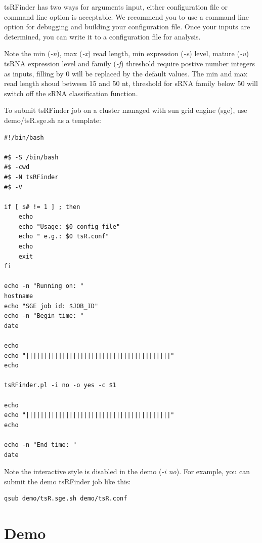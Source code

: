 \documentclass[11pt, a4paper]{article}
\begin{document}
tsRFinder has two ways for arguments input, either configuration file or command line option is acceptable. We recommend you to use a command line option for debugging and building your configuration file. Once your inputs are determined, you can write it to a configuration file for analysis.

Note the min (\emph{-n}), max (\emph{-x}) read length, min expression (\emph{-e}) level, mature (\emph{-u}) tsRNA expression level and family (\emph{-f}) threshold require postive number integers as inputs, filling by 0 will be replaced by the default values. The min and max read length shoud between 15 and 50 nt, threshold for sRNA family below 50 will switch off the sRNA classification function.

To submit tsRFinder job on a cluster managed with sun grid engine (sge), use demo/tsR.sge.sh as a template:

{\scriptsize \begin{tcolorbox}[colback=blue!5!white,colframe=pink!75!black,title=demo/tsR.sge.sh]
\begin{verbatim}
#!/bin/bash

#$ -S /bin/bash
#$ -cwd
#$ -N tsRFinder
#$ -V

if [ $# != 1 ] ; then
	echo
	echo "Usage: $0 config_file"
	echo " e.g.: $0 tsR.conf"
	echo
	exit
fi

echo -n "Running on: "
hostname
echo "SGE job id: $JOB_ID"
echo -n "Begin time: "
date

echo
echo "||||||||||||||||||||||||||||||||||||||||"
echo

tsRFinder.pl -i no -o yes -c $1

echo
echo "||||||||||||||||||||||||||||||||||||||||"
echo

echo -n "End time: "
date
\end{verbatim}
\end{tcolorbox}}

Note the interactive style is disabled in the demo (\emph{-i no}). For example, you can submit the demo tsRFinder job like this:

{\scriptsize \begin{tcolorbox}[colback=blue!5!white,colframe=pink!75!black,title=submit a demo tsRFinder job]
\begin{verbatim}
qsub demo/tsR.sge.sh demo/tsR.conf
\end{verbatim}
\end{tcolorbox}}

\section{Demo}
\end{document}
